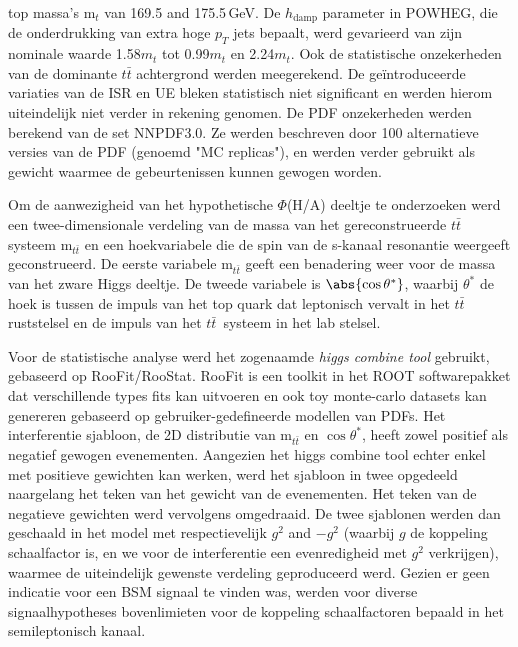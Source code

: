 top massa's $\text{m}_t$ van 169.5 and 175.5\,GeV. De $h_{\text{damp}}$
parameter in \textsc{POWHEG}, die de onderdrukking van
extra hoge $p_T$ jets bepaalt, werd gevarieerd van zijn nominale waarde
1.58$m_{t}$ tot 0.99$m_{t}$ en 2.24$m_{t}$. Ook de statistische onzekerheden
van de dominante $t\bar t$ achtergrond werden meegerekend. De
ge\"introduceerde variaties van de ISR en UE bleken statistisch niet
significant en werden hierom uiteindelijk niet verder in rekening genomen. De
PDF onzekerheden werden berekend van de set NNPDF3.0. Ze werden beschreven
door 100 alternatieve versies van de PDF (genoemd "MC replicas"), en werden
verder gebruikt als gewicht waarmee de gebeurtenissen kunnen gewogen
worden. 
  
Om de aanwezigheid van het hypothetische $\Phi$(H/A) deeltje te onderzoeken
werd een twee-dimensionale verdeling van de massa van het gereconstrueerde
$t\bar t$ systeem m$_{t\bar t}$ en een hoekvariabele die de spin van de
s-kanaal resonantie  weergeeft geconstrueerd. De eerste variabele m$_{t\bar
  t}$ geeft een benadering weer voor de massa van het zware Higgs deeltje. De
tweede variabele is $\abs{\cos\theta^*}$, waarbij $\theta^*$ de hoek is tussen de
impuls van het top quark dat leptonisch vervalt in het $t\bar{t}$ ruststelsel
en de impuls van het $t\bar{t}$~systeem in het lab stelsel. 
 
Voor de statistische analyse werd het zogenaamde {\it higgs combine tool}
gebruikt, gebaseerd op RooFit/RooStat. RooFit is een toolkit in het ROOT
softwarepakket dat verschillende types fits kan uitvoeren en 
ook toy monte-carlo datasets kan genereren gebaseerd op gebruiker-gedefineerde
modellen van PDFs. Het 
interferentie sjabloon, de 2D distributie van m$_{t\bar t}$ en $\cos\theta^*$,
heeft zowel positief als negatief gewogen evenementen. Aangezien het higgs
combine tool echter enkel met positieve gewichten kan werken, werd het
sjabloon in twee opgedeeld naargelang het teken van het gewicht van de
evenementen. Het teken van de negatieve gewichten werd vervolgens omgedraaid. De
twee sjablonen werden dan geschaald in het model met respectievelijk $g^2$ and
$-g^2$ (waarbij $g$ de koppeling schaalfactor is, en we voor de interferentie
een evenredigheid met $g^2$ verkrijgen), waarmee de uiteindelijk gewenste
verdeling geproduceerd werd. Gezien er geen indicatie voor een BSM signaal te
vinden was, werden voor diverse signaalhypotheses 
bovenlimieten voor de koppeling schaalfactoren bepaald in het semileptonisch kanaal. 
 
